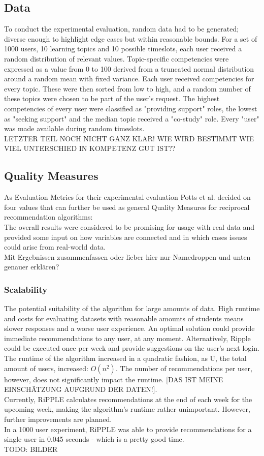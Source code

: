 \documentclass[nochapterpage,bigchapter,linedtoc,longdoc,colorback,accentcolor=tud3b]{tudreport}
\begin{document}
\subsection{Data}
To conduct the experimental evaluation, random data had to be generated; diverse enough to highlight edge cases but within reasonable bounds. For a set of 1000 users, 10 learning topics and 10 possible timeslots, each user received a random distribution of relevant values. Topic-specific competencies were expressed as a value from 0 to 100 derived from a truncated normal distribution around a random mean with fixed variance. Each user received competencies for every topic. These were then sorted from low to high, and a random number of these topics were chosen to be part of the user's request. The highest competencies of every user were classified as "providing support" roles, the lowest as "seeking support" and the median topic received a "co-study" role. Every "user" was made available during random timeslots.\\
LETZTER TEIL NOCH NICHT GANZ KLAR! WIE WIRD BESTIMMT WIE VIEL UNTERSCHIED IN KOMPETENZ GUT IST??\\

\subsection{Quality Measures}
As Evaluation Metrics for their experimental evaluation Potts et al. decided on four values that can further be used as general Quality Measures for reciprocal recommendation algorithms:\\
The overall results were considered to be promising for usage with real data and provided some input on how variables are connected and in which cases issues could arise from real-world data.\\
Mit Ergebnissen zusammenfassen oder lieber hier nur Namedroppen und unten genauer erklären?\\	
\subsubsection{Scalability} The potential suitability of the algorithm for large amounts of data. High runtime and costs for evaluating datasets with reasonable amounts of students means slower responses and a worse user experience. An optimal solution could provide immediate recommendations to any user, at any moment. Alternatively, Ripple could be executed once per week and provide suggestions on the user's next login.\\
The runtime of the algorithm increased in a quadratic fashion, as U, the total amount of users, increased: \(O(n^2)\). The number of recommendations per user, however, does not significantly impact the runtime. [DAS IST MEINE EINSCHÄTZUNG AUFGRUND DER DATEN!].\\
Currently, RiPPLE calculates recommendations at the end of each week for the upcoming week, making the algorithm's runtime rather unimportant. However, further improvements are planned.\\
In a 1000 user experiment, RiPPLE was able to provide recommendations for a single user in 0.045 seconds - which is a pretty good time.\\
TODO: BILDER
\end{document}
